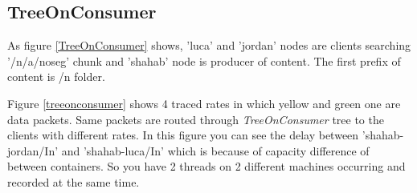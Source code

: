\subsection{TreeOnConsumer}
As figure \ref{TreeOnConsumer} shows, 'luca' and 'jordan' nodes are clients searching '/n/a/noseg' chunk and 'shahab' node is producer of content. The first prefix of content is /n folder.

Figure \ref{treeonconsumer} shows 4 traced rates in which yellow and green one are data packets. Same packets are routed through \textit{TreeOnConsumer} tree to the clients with different rates. In this figure you can see the delay between 'shahab-jordan/In' and 'shahab-luca/In' which is because of capacity difference of between containers. So you have 2 threads on 2 different machines occurring and recorded at the same time.

